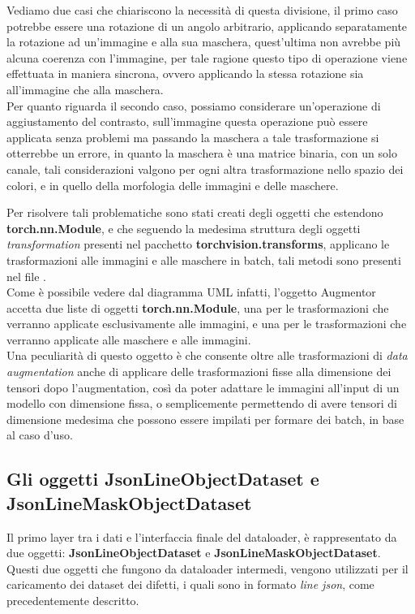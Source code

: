Vediamo due casi che chiariscono la necessità di questa divisione, il primo caso potrebbe essere una rotazione di un angolo arbitrario,
applicando separatamente la rotazione ad un'immagine e alla sua maschera, quest'ultima non avrebbe più alcuna coerenza con l'immagine,
per tale ragione questo tipo di operazione viene effettuata in maniera sincrona, ovvero applicando la stessa rotazione sia all'immagine che alla maschera.\\
Per quanto riguarda il secondo caso, possiamo considerare un'operazione di aggiustamento del contrasto, sull'immagine questa operazione può essere
applicata senza problemi ma passando la maschera a tale trasformazione si otterrebbe un errore, in quanto la maschera è una matrice binaria, con un solo canale,
tali considerazioni valgono per ogni altra trasformazione nello spazio dei colori, e in quello della morfologia delle immagini e delle maschere.

Per risolvere tali problematiche sono stati creati degli oggetti che estendono \textbf{torch.nn.Module}, e che seguendo la medesima struttura degli oggetti
\textit{transformation} presenti nel pacchetto \textbf{torchvision.transforms}, applicano le trasformazioni alle immagini e alle maschere in batch, tali metodi
sono presenti nel file .\\
Come è possibile vedere dal diagramma UML infatti, l'oggetto Augmentor accetta due liste di oggetti \textbf{torch.nn.Module}, una per le trasformazioni
che verranno applicate esclusivamente alle immagini, e una per le trasformazioni che verranno applicate alle maschere e alle immagini.\\

Una peculiarità di questo oggetto è che consente oltre alle trasformazioni di \textit{data augmentation} anche di applicare delle trasformazioni
fisse alla dimensione dei tensori dopo l'augmentation, così da poter adattare le immagini all'input di un modello con dimensione fissa, o semplicemente
permettendo di avere tensori di dimensione medesima che possono essere impilati per formare dei batch, in base al caso d'uso.



\subsection{Gli oggetti JsonLineObjectDataset e JsonLineMaskObjectDataset}
Il primo layer tra i dati e l'interfaccia finale del dataloader, è rappresentato da due oggetti: \textbf{JsonLineObjectDataset} e \textbf{JsonLineMaskObjectDataset}.
Questi due oggetti che fungono da dataloader intermedi, vengono utilizzati per il caricamento dei dataset dei difetti, 
i quali sono in formato \textit{line json}, come precedentemente descritto.


